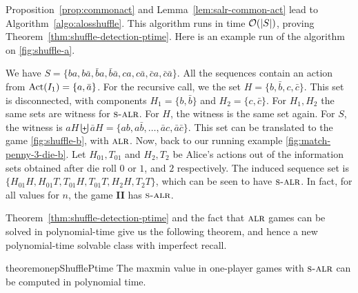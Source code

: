 

Proposition~\ref{prop:commonact} and Lemma~\ref{lem:salr-common-act} lead
to
Algorithm~\ref{algo:alosshuffle}.      This algorithm runs in time $\mathcal{O}(|S|)$, proving
Theorem~\ref{thm:shuffle-detection-ptime}.
Here is an example run of the algorithm on \cref{fig:shuffle-a}. 

We
have $S = \{ ba, b\bar{a}, \bar{b}a, \bar{b}\bar{a}, ca, c\bar{a}, \bar{c}
a, \bar{c} \bar{a} \}$. All the sequences contain an action from
$\operatorname{Act}(I_1) = \{a, \bar{a}\}$. For the recursive call, we the set
$H = \{b, \bar{b}, c, \bar{c}\}$. This set is disconnected, with
components $H_1 = \{b, \bar{b}\}$ and $H_2 = \{c, \bar{c}\}$. For
$H_1, H_2$ the same sets are witness for $\textsc{s-alr}$. For $H$, the witness
is the same set again. For $S$, the witness is
$aH \biguplus \bar{a}H = \{ab, a\bar{b}, \dots, \bar{a} c, \bar{a}
\bar{c} \}$. This set can be translated to the game
\cref{fig:shuffle-b}, with $\textsc{alr}$.   Now, back to our
running example \cref{fig:match-penny-3-die-b}. Let $H_{01}, T_{01}$ and
$H_2, T_2$ be Alice's actions out of the information sets obtained
after die roll $0$ or $1$, and $2$ respectively. The induced
sequence set is $\{ H_{01} H, H_{01} T, T_{01} H, T_{01}T, H_2 H, T_2
T \}$, which can be seen to have $\textsc{s-alr}$. In fact, for all values for
$n$, the game \textbf{II} has $\textsc{s-alr}$.
                                                             

Theorem~\ref{thm:shuffle-detection-ptime} and the fact that $\textsc{alr}$
games can be solved in polynomial-time give us the following theorem,
and hence a new polynomial-time solvable class with imperfect
recall.

 
\begin{restatable}{theorem}{onepShufflePtime}\label{thm:1p-shuffle-ptime}
  The maxmin value in one-player games with $\textsc{s-alr}$ can be computed in
  polynomial time.
\end{restatable}
         
\endinput

To prove \cref{thm:1p-shuffle-ptime} we consider behavioral
strategies expressed using probability variables ; $x_a$ for action
$a$. For a leaf $t \in L$ in a game structure $\Tt$ the product of
action variables on $\pathto(t)$ gives a \emph{leaf monomial}
$\mu(t)$. Now for a game $G$ on $\Tt$, the polynomial given by
$\sum\limits_{t \in L}\mu(t)Prob_{\chance}(t)\Uu(t)$ is the payoff
polynomial of $G$. A valuation of $\{x_a\}_{a \in A}$ in $[0,1]^{|A|}$
satisfying the \emph{strategy constraints}
\[ \forall I \in \Ii,~ \sum\limits_{a \in Act(I)} x^I_{a} = 1\] gives
a behavioral strategy and the corresponding valuation of the payoff
polynomial is the corresponding expected payoff. Computing maxmin
value is equivalent to optimizing the payoff polynomial under the
strategy constraints.

